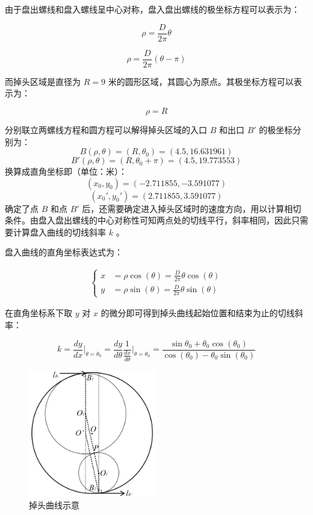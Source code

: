\documentclass[a4paper]{article}
\begin{document}
		由于盘出螺线和盘入螺线呈中心对称，盘入盘出螺线的极坐标方程可以表示为：

		\begin{equation}
			\rho = \frac{D}{2\pi} \theta
		\end{equation}

		\begin{equation}
			\rho = \frac{D}{2\pi} (\theta - \pi)
		\end{equation}

		而掉头区域是直径为 $R = 9$ 米的圆形区域，其圆心为原点。其极坐标方程可以表示为：

		\begin{equation}
			\rho = R
		\end{equation}

		分别联立两螺线方程和圆方程可以解得掉头区域的入口 $B$ 和出口 $B'$ 的极坐标分别为：
		$$ B(\rho, \theta) = (R, \theta_0) = (4.5, 16.631961) $$
		$$ B'(\rho, \theta) = (R, \theta_0 + \pi) = (4.5, 19.773553)$$
		换算成直角坐标即（单位：米）：
		$$ (x_0, y_0) = (-2.711855, -3.591077) $$
		$$ (x_0', y_0') = (2.711855, 3.591077) $$
		确定了点 $B$ 和点 $B'$ 后，还需要确定进入掉头区域时的速度方向，用以计算相切条件。由盘入盘出螺线的中心对称性可知两点处的切线平行，斜率相同，因此只需要计算盘入曲线的切线斜率 $k$ 。

		盘入曲线的直角坐标表达式为：

		\begin{align}
			\left\{
			\begin{aligned}
				x &= \rho \cos(\theta) = \frac{D}{2\pi} \theta \cos(\theta) \\
				y &= \rho \sin(\theta) = \frac{D}{2\pi} \theta \sin(\theta)
			\end{aligned}
			\right.
		\end{align}

		在直角坐标系下取 $y$ 对 $x$ 的微分即可得到掉头曲线起始位置和结束为止的切线斜率：

		\begin{equation}
			k = \frac{dy}{dx}\Bigg|_{\theta=\theta_0} = \frac{dy}{d\theta} \frac{1}{\frac{dx}{d\theta}} \Bigg|_{\theta=\theta_0} = \frac{\sin\theta_0 + \theta_0 \cos(\theta_0)}{\cos(\theta_0) - \theta_0 \sin(\theta_0)}
		\end{equation}

		\begin{figure}[H]
			\centering
			\includegraphics[width=0.5\textwidth]{image/Figure_5411.png}
			\caption{掉头曲线示意}
			\label{Figure_5411}
		\end{figure}
\end{document}
